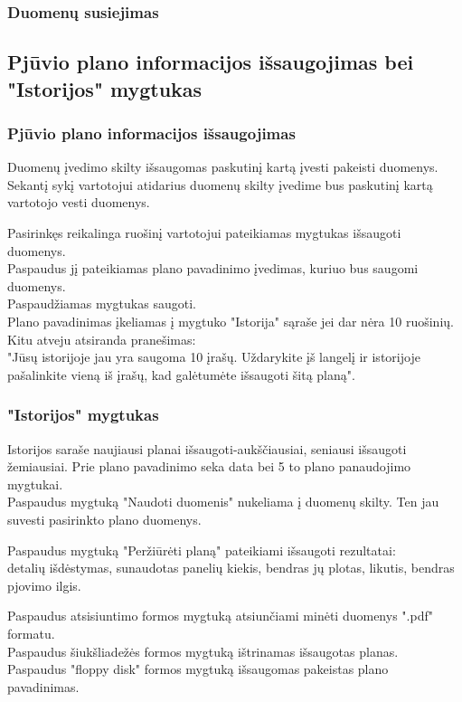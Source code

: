 \documentclass[a4paper,12pt]{article}
\begin{document}
\subsubsection{Duomenų susiejimas}





\subsection{ Pjūvio plano informacijos išsaugojimas bei "Istorijos" mygtukas}
\subsubsection{Pjūvio plano informacijos išsaugojimas}
Duomenų įvedimo skilty išsaugomas paskutinį kartą įvesti pakeisti duomenys.\\
Sekantį sykį vartotojui atidarius duomenų skilty įvedime bus paskutinį kartą vartotojo vesti duomenys.

Pasirinkęs reikalinga ruošinį vartotojui pateikiamas mygtukas išsaugoti duomenys. \\
Paspaudus jį pateikiamas plano pavadinimo įvedimas, kuriuo bus saugomi duomenys. \\
Paspaudžiamas mygtukas saugoti. \\
Plano pavadinimas įkeliamas į mygtuko "Istorija" sąraše jei dar nėra 10 ruošinių.\\
Kitu atveju atsiranda pranešimas: \\
"Jūsų istorijoje jau yra saugoma 10 įrašų. Uždarykite įš langelį ir istorijoje pašalinkite vieną iš įrašų, kad galėtumėte išsaugoti šitą planą". \\

\subsubsection{"Istorijos" mygtukas}
Istorijos saraše naujiausi planai išsaugoti-aukščiausiai, seniausi išsaugoti žemiausiai.
Prie plano pavadinimo seka data bei 5 to plano panaudojimo mygtukai.\\
Paspaudus mygtuką "Naudoti duomenis" nukeliama į duomenų skilty.
Ten jau suvesti pasirinkto plano duomenys.

Paspaudus mygtuką "Peržiūrėti planą" pateikiami išsaugoti rezultatai:\\
detalių išdėstymas, sunaudotas panelių kiekis, bendras jų plotas, likutis, bendras pjovimo ilgis.

Paspaudus atsisiuntimo formos mygtuką atsiunčiami minėti duomenys ".pdf" formatu.\\
Paspaudus šiukšliadežės formos mygtuką ištrinamas išsaugotas planas.\\
Paspaudus "floppy disk" formos mygtuką išsaugomas pakeistas plano pavadinimas.
\end{document}
